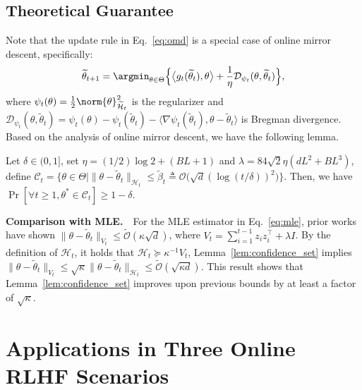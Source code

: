 \subsection{Theoretical Guarantee}
Note that the update rule in Eq.~\eqref{eq:omd} is a special case of online mirror descent, specifically:
\begin{align*}
  \widetilde{\theta}_{t+1}=\argmin_{\theta \in \Theta} \Big\{\big\langle g_t(\widetilde{\theta}_t), \theta \big\rangle +\frac{1}{\eta}\mathcal{D}_{\psi_t}(\theta, \widetilde{\theta}_t)\Big\},
\end{align*}
where $\psi_t(\theta) = \frac{1}{2}\norm{\theta}_{\widetilde{\mathcal{H}}_t}^2$ is the regularizer and $\mathcal{D}_{\psi_t}(\theta, \widetilde{\theta}_t) = \psi_t(\theta) - \psi_t(\widetilde{\theta}_t) - \langle \nabla \psi_t(\widetilde{\theta}_t), \theta - \widetilde{\theta}_t \rangle$ is Bregman divergence. Based on the analysis of online mirror descent, we have the following lemma.

\begin{myLemma}
    \label{lem:confidence_set}
    Let $\delta \in(0,1]$, set $\eta=(1 / 2) \log 2+\left(BL+1\right)$ and $\lambda=84 \sqrt{2} \eta (dL^2 + BL^3)$, define $\mathcal{C}_t =\{\theta \in \Theta \mid \|\theta - \widetilde{\theta}_t \|_{\mathcal{H}_t} \leq \widetilde{\beta}_t\triangleq \mathcal{O} \big(\sqrt{d}(\log (t / \delta))^2\big) \}$. Then, we have $\operatorname{Pr}\left[\forall t \geqslant 1, \theta^* \in \mathcal{C}_t\right] \geqslant 1-\delta$.
\end{myLemma}


\textbf{Comparison with MLE.}~~For the MLE estimator in Eq.~\eqref{eq:mle}, prior works~\citep{ICML'23:Zhu-Principled,arXiv'24:Das-RLHF-active,arXiv'24:Ji-RLHF-active} have shown $\|\theta - \widetilde{\theta}_t\|_{V_t} \leq \widetilde{\mathcal{O}}(\kappa \sqrt{d})$, where $V_t = \sum_{i=1}^{t-1} z_i z_i^\top + \lambda I$. By the definition of $\mathcal{H}_t$, it holds that $\mathcal{H}_t \succeq \kappa^{-1} V_t$, Lemma~\ref{lem:confidence_set} implies $\|\theta - \widetilde{\theta}_t\|_{V_t} \leq \sqrt{\kappa} \|\theta - \widetilde{\theta}_t\|_{\mathcal{H}_t} \leq \widetilde{\mathcal{O}}(\sqrt{\kappa d})$. This result shows that Lemma~\ref{lem:confidence_set} improves upon previous bounds by at least a factor of $\sqrt{\kappa}$.


\section{Applications in Three Online RLHF Scenarios}
\label{sec:applications}


